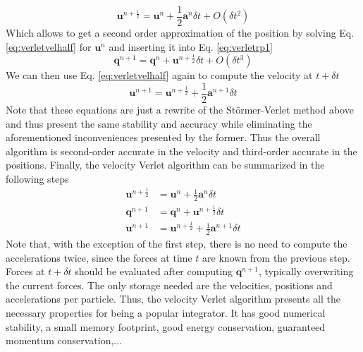 \documentclass[twoside,openright,titlepage,numbers=noenddot,%
headinclude,footinclude,cleardoublepage=empty,abstract=on,
BCOR=5mm,fontsize=11pt, dvipsnames, paper=b5
]{scrreprt}
\renewcommand{\vec}[1]{\bm{#1}}
\newcommand{\dt}{\delta t}
\newcommand{\half}{\frac{1}{2}}
\newcommand{\ppos}{q}
\newcommand{\pvel}{u}
\begin{document}
\begin{equation}
  \label{eq:verletvelhalf}
  \vec{\pvel}^{n+\half} = \vec{\pvel}^n + \half\vec{a}^n\dt + O(\dt^2)
\end{equation}
Which allows to get a second order approximation of the position by  solving Eq. \eqref{eq:verletvelhalf} for $\vec{\pvel}^n$ and inserting it into Eq. \eqref{eq:verletrp1}
\begin{equation}
  \vec{\ppos}^{n+1} = \vec{\ppos}^n +  \vec{\pvel}^{n+\half}\dt + O(\dt^3)
\end{equation}
We can then use Eq. \eqref{eq:verletvelhalf} again to compute the velocity at $t+\dt$
\begin{equation}
  \vec{\pvel}^{n+1} = \vec{\pvel}^{n+\half} + \half\vec{a}^{n+1}\dt
\end{equation}
Note that these equations are just a rewrite of the Störmer-Verlet method above and thus present the same stability and accuracy while eliminating the aforementioned inconveniences presented by the former.
Thus the overall algorithm is second-order accurate in the velocity and third-order accurate in the positions.
Finally, the velocity Verlet algorithm can be summarized in the following steps
\begin{equation}
  \label{eq:verletnve}
  \begin{aligned}
    \vec{\pvel}^{n+\half}&= \vec{\pvel}^n + \half \vec{a}^n\dt\\
  \vec{\ppos}^{n+1}      &= \vec{\ppos}^n +  \vec{\pvel}^{n+\half}\dt\\
  \vec{\pvel}^{n+1}      &= \vec{\pvel}^{n+\half} + \half\vec{a}^{n+1}\dt
\end{aligned}
\end{equation}
Note that, with the exception of the first step, there is no need to compute the accelerations twice, since the forces at time $t$ are known from the previous step. Forces at $t+\dt$ should be evaluated after computing $\vec{\ppos}^{n+1}$, typically overwriting the current forces. The only storage needed are the velocities, positions and accelerations per particle.
Thus, the velocity Verlet algorithm presents all the necessary properties for being a popular integrator. It has good numerical stability, a small memory footprint, good energy conservation, guaranteed momentum conservation,...

%
\end{document}
